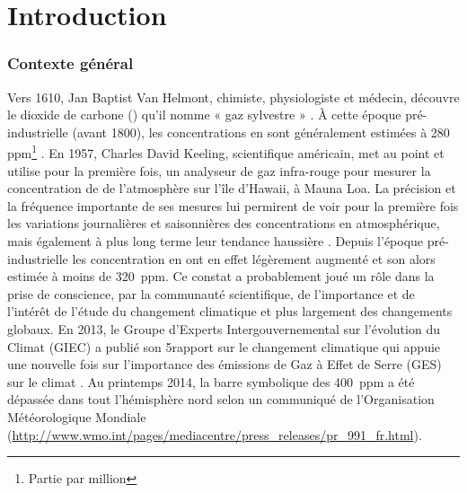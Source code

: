 
\chapter*{Introduction}
\newpage


\subsection*{Contexte général}

Vers 1610, Jan Baptist Van Helmont, chimiste, physiologiste et médecin, découvre le dioxide de carbone (\coo) qu'il nomme « gaz sylvestre » \citep{privatdegarilhe2015}.
À cette époque pré-industrielle (avant 1800), les concentrations en \coo sont généralement estimées à 280 ppm\footnote{Partie par million} \citep{Siegenthaler1987}.
En 1957, Charles David Keeling, scientifique américain, met au point et utilise pour la première fois, un analyseur de gaz infra-rouge pour mesurer la concentration de \coo de l'atmosphère sur l'île d'Hawaii, à Mauna Loa.
La précision et la fréquence importante de ses mesures lui permirent de voir pour la première fois les variations journalières et saisonnières des concentrations en \coo atmosphérique, mais également à plus long terme leur tendance haussière \citep{harris2010}.
Depuis l'époque pré-industrielle les concentration en \coo ont en effet légèrement augmenté et son alors estimée à moins de \SI{320}{ppm}.
Ce constat a probablement joué un rôle dans la prise de conscience, par la communauté scientifique, de l'importance et de l'intérêt de l'étude du changement climatique et plus largement des changements globaux.
En 2013, le Groupe d'Experts Intergouvernemental sur l'évolution du Climat (GIEC) a publié son 5\ieme rapport sur le changement climatique qui appuie une nouvelle fois sur l'importance des émissions de Gaz à Effet de Serre (GES) sur le climat \citep{stocker2013}.
Au printemps 2014, la barre symbolique des \SI{400}{ppm} a été dépassée dans tout l'hémisphère nord selon un communiqué de l'Organisation Météorologique Mondiale (\url{http://www.wmo.int/pages/mediacentre/press_releases/pr_991_fr.html}).

